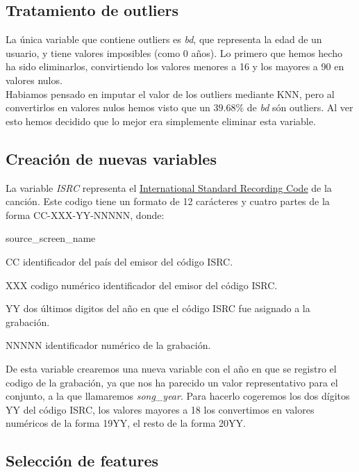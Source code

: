 \documentclass[a4paper]{article}
\begin{document}
\subsection{Tratamiento de outliers}

La única variable que contiene outliers es \textit{bd}, que representa la edad de un usuario, y tiene valores imposibles (como 0 años). Lo primero que hemos hecho ha sido eliminarlos, convirtiendo los valores menores a 16 y los mayores a 90 en valores nulos.\\

Habiamos pensado en imputar el valor de los outliers mediante KNN, pero al convertirlos en valores nulos hemos visto que un $39.68\%$ de \textit{bd} són outliers. Al ver esto hemos decidido que lo mejor era simplemente eliminar esta variable.

\subsection{Creación de nuevas variables}

La variable \textit{ISRC} representa el \href{https://en.wikipedia.org/wiki/International_Standard_Recording_Code}{International Standard Recording Code} de la canción. Este codigo tiene un formato de 12 carácteres y cuatro partes de la forma CC-XXX-YY-NNNNN, donde:

\begin{labeling}{source\_screen\_name}
\item [CC] identificador del país del emisor del código ISRC.
\item [XXX] codigo numérico identificador del emisor del código ISRC.
\item [YY] dos últimos digitos del año en que el código ISRC fue asignado a la grabación.
\item [NNNNN] identificador numérico de la grabación.
\end{labeling}

De esta variable crearemos una nueva variable con el año en que se registro el codigo de la grabación, ya que nos ha parecido un valor representativo para el conjunto, a la que llamaremos \textit{song\_year}. Para hacerlo cogeremos los dos dígitos YY del código ISRC, los valores mayores a 18 los convertimos en valores numéricos de la forma 19YY, el resto de la forma 20YY.

\subsection{Selección de features}
\end{document}
